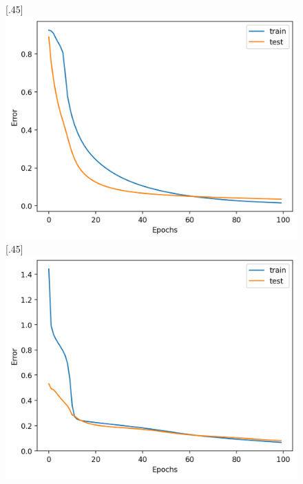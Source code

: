 \documentclass[12pt,a4paper]{article}
\begin{document}
\begin{figure}[H]
    [.45\linewidth]{
        \includegraphics[width=\linewidth]{img/14-training_error.png}
    }
    [.45\linewidth]{
        \includegraphics[width=\linewidth]{img/15-training_error.png}
    }
\end{figure}

\newpage
\end{document}
